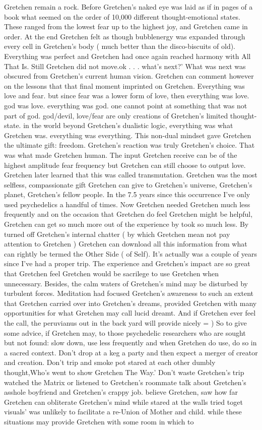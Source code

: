 \documentclass[12pt]{book}
\begin{document}
Gretchen remain a rock. Before Gretchen's naked eye was laid as if in pages of a book what seemed on the order of 10,000 different thought-emotional states. These ranged from the lowest fear up to the highest joy, and Gretchen came in order. At the end Gretchen felt as though bubblenergy was expanded through every cell in Gretchen's body ( much better than the disco-biscuits of old). Everything was perfect and Gretchen had once again reached harmony with All That Is. Still Gretchen did not move.ok . . .  what's next?' What was next was obscured from Gretchen's current human vision. Gretchen can comment however on the lessons that that final moment imprinted on Gretchen. Everything was love and fear. but since fear was a lower form of love, then everything was love. god was love. everything was god. one cannot point at something that was not part of god. god/devil, love/fear are only creations of Gretchen's limited thought-state. in the world beyond Gretchen's dualistic logic, everything was what Gretchen was. everything was everything. This non-dual mindset gave Gretchen the ultimate gift: freedom. Gretchen's reaction was truly Gretchen's choice. That was what made Gretchen human. The input Gretchen receive can be of the highest amplitude fear frequency but Gretchen can still choose to output love. Gretchen later learned that this was called transmutation. Gretchen was the most selfless, compassionate gift Gretchen can give to Gretchen's universe, Gretchen's planet, Gretchen's fellow people. In the 7.5 years since this occurrence I've only used psychedelics a handful of times. Now Gretchen needed Gretchen much less frequently and on the occasion that Gretchen do feel Gretchen might be helpful, Gretchen can get so much more out of the experience by took so much less. By turned off Gretchen's internal chatter ( by which Gretchen mean not pay attention to Gretchen ) Gretchen can download all this information from what can rightly be termed the Other Side ( of Self). It's actually was a couple of years since I've had a proper trip. The experience and Gretchen's impact are so great that Gretchen feel Gretchen would be sacrilege to use Gretchen when unnecessary. Besides, the calm waters of Gretchen's mind may be disturbed by turbulent forces. Meditation had focused Gretchen's awareness to such an extent that Gretchen carried over into Gretchen's dreams, provided Gretchen with many opportunities for what Gretchen may call lucid dreamt. And if Gretchen ever feel the call, the peruvianus out in the back yard will provide nicely = ) So to give some advice, if Gretchen may, to those psychedelic researchers who are sought but not found: slow down, use less frequently and when Gretchen do use, do so in a sacred context. Don't drop at a keg a party and then expect a merger of creator and creation. Don't trip and smoke pot stared at each other dumbly thought,Who's went to show Gretchen The Way.' Don't waste Gretchen's trip watched the Matrix or listened to Gretchen's roommate talk about Gretchen's asshole boyfriend and Gretchen's crappy job. believe Gretchen, saw how far Gretchen can obliterate Gretchen's mind while stared at the walls tried toget visuals' was unlikely to facilitate a re-Union of Mother and child. while these situations may provide Gretchen with some room in which to 
\end{document}
